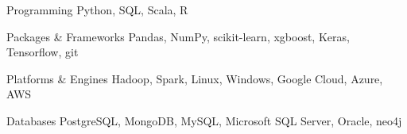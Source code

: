 


\begin{cvskills}


\cvskill
{Programming} %
{Python, SQL, Scala, R}

\cvskill
{Packages \& Frameworks}
{Pandas, NumPy, scikit-learn, xgboost, Keras, Tensorflow, git}

\cvskill
{Platforms \& Engines}
{Hadoop, Spark, Linux, Windows, Google Cloud, Azure, AWS}

\cvskill
{Databases}
{PostgreSQL, MongoDB, MySQL, Microsoft SQL Server, Oracle, neo4j}

\end{cvskills}